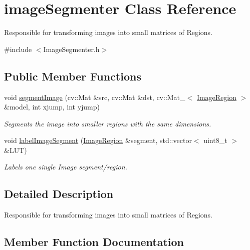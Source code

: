 \hypertarget{classimage_segmenter}{}\section{image\+Segmenter Class Reference}
\label{classimage_segmenter}


Responsible for transforming images into small matrices of Regions.  




{\ttfamily \#include $<$Image\+Segmenter.\+h$>$}

\subsection*{Public Member Functions}
\begin{DoxyCompactItemize}
\item 
void \hyperlink{classimage_segmenter_ae290d94539d650dff3f0d870319941a8}{segment\+Image} (cv\+::\+Mat \&src, cv\+::\+Mat \&dst, cv\+::\+Mat\+\_\+$<$ \hyperlink{class_image_region}{Image\+Region} $>$ \&model, int xjump, int yjump)
\begin{DoxyCompactList}\small\item\em Segments the image into smaller regions with the same dimensions. \end{DoxyCompactList}\item 
void \hyperlink{classimage_segmenter_a310b907fa8356c42a22dd0c73cb1f3cc}{label\+Image\+Segment} (\hyperlink{class_image_region}{Image\+Region} \&segment, std\+::vector$<$ uint8\+\_\+t $>$ \&L\+UT)
\begin{DoxyCompactList}\small\item\em Labels one single Image segment/region. \end{DoxyCompactList}\end{DoxyCompactItemize}


\subsection{Detailed Description}
Responsible for transforming images into small matrices of Regions. 

\subsection{Member Function Documentation}
\mbox{\label{classimage_segmenter_a310b907fa8356c42a22dd0c73cb1f3cc}} 
